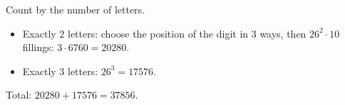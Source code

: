 Count by the number of letters.
\begin{itemize}
\item Exactly $2$ letters: choose the position of the digit in $3$ ways, then $26^2\cdot10$ fillings: $3\cdot6760=20280$.
\item Exactly $3$ letters: $26^3=17576$.
\end{itemize}
Total: $20280+17576=\boxed{37856}$.
